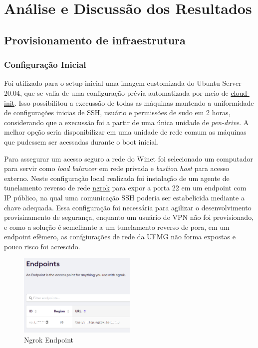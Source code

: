 
\chapter{Análise e Discussão dos Resultados}
\label{chap:provisionamento}

\section{Provisionamento de infraestrutura}

\subsection{Configuração Inicial}

Foi utilizado para o setup inicial uma imagem customizada do Ubuntu Server 20.04, que se valia de uma configuração prévia automatizada por meio de \href{https://cloudinit.readthedocs.io/en/latest/}{cloud-init}. Isso possibilitou a execussão de todas as máquinas mantendo a uniformidade de configurações inicias de SSH, usuário e permissões de {sudo} em 2 horas, considerando que a execussão foi a partir de uma única unidade de \emph{pen-drive}. A melhor opção seria disponibilizar em uma unidade de rede comum as máquinas que pudessem ser acessadas durante o boot inicial.

Para assegurar um acesso seguro a rede do Winet foi selecionado um computador para servir como \emph{load balancer} em rede privada e \emph{bastion host} para acesso externo. Neste configuração local realizada foi instalação de um agente de tunelamento reverso de rede \href{https://ngrok.io}{ngrok} para expor a porta 22 em um endpoint com IP público, na qual uma comunicação SSH poderia ser estabelicida mediante a chave adequada. Essa configuração foi necessária para agilizar o desenvolvimento provisinamento de segurança, enquanto um usuário de VPN não foi provisionado, e como a solução é semelhante a um tunelamento reverso de pora, em um endpoint efêmero, as confgiurações de rede da UFMG não forma expostas e pouco risco foi acrescido. 


\begin{figure}[!ht]
    \centering
    \includegraphics[width=0.5\textwidth]{04-figuras/ngrok.png}
    \caption{Ngrok Endpoint}
    \label{fig:ngrok}
\end{figure}

